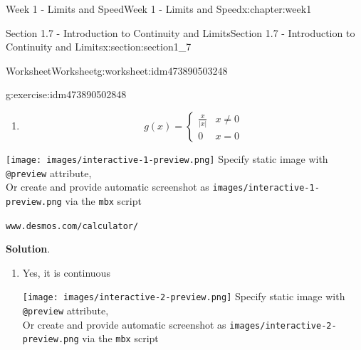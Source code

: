\documentclass[oneside,10pt,]{book}
\newcommand{\blocktitlefont}{\relax}
\newcommand{\mono}[1]{\texttt{#1}}
\numberwithin{equation}{section}
\newlength{\qrsize}
\newlength{\previewwidth}
\begin{document}
\begin{chapterptx}{Week 1 - Limits and Speed}{}{Week 1 - Limits and Speed}{}{}{x:chapter:week1}
\begin{sectionptx}{Section 1.7 - Introduction to Continuity and Limits}{}{Section 1.7 - Introduction to Continuity and Limits}{}{}{x:section:section1_7}
\begin{worksheet-subsection}{Worksheet}{}{Worksheet}{}{}{g:worksheet:idm473890503248}
\begin{divisionexercise}{1}{}{}{g:exercise:idm473890502848}
\begin{enumerate}[label=(\alph*)]
\begin{equation*}
\end{equation*}
%
\item{}%
\begin{equation*}
g(x) = \left\{ \begin{matrix} \frac x{\left\vert x \right\vert} & x \neq 0 \\ 0 & x = 0 \end{matrix} \right. 
\end{equation*}
%
\end{enumerate}
\setlength{\qrsize}{9em}
\setlength{\previewwidth}{\linewidth}
\addtolength{\previewwidth}{-\qrsize}
\begin{tcbraster}[raster columns=2, raster column skip=1pt, raster halign=center, raster force size=false, raster left skip=0pt, raster right skip=0pt]%
\begin{tcolorbox}[previewstyle, width=\previewwidth]%
%
{\texttt{[image: images/interactive-1-preview.png]}}%
{\small{}Specify static image with \mono{@preview} attribute,\\Or create and provide automatic screenshot as \mono{images/interactive-1-preview.png} via the \mono{mbx} script}%
\end{tcolorbox}%
\begin{tcolorbox}[qrstyle]%
{\hypersetup{urlcolor=black}}%
\end{tcolorbox}%
\begin{tcolorbox}[captionstyle]%
\small \mono{www.desmos.com/calculator/}\end{tcolorbox}%
\end{tcbraster}%
%
\textbf{\blocktitlefont Solution}.\hypertarget{g:solution:idm473890494624}{}\quad{}%
\begin{enumerate}[label=(\alph*)]
\item{}Yes, it is continuous%
\par
\setlength{\qrsize}{9em}
\setlength{\previewwidth}{\linewidth}
\addtolength{\previewwidth}{-\qrsize}
\begin{tcbraster}[raster columns=2, raster column skip=1pt, raster halign=center, raster force size=false, raster left skip=0pt, raster right skip=0pt]%
\begin{tcolorbox}[previewstyle, width=\previewwidth]%
%
{\texttt{[image: images/interactive-2-preview.png]}}%
{\small{}Specify static image with \mono{@preview} attribute,\\Or create and provide automatic screenshot as \mono{images/interactive-2-preview.png} via the \mono{mbx} script}%

\end{tcolorbox}
\end{tcbraster}
\end{enumerate}
\end{divisionexercise}
\end{worksheet-subsection}
\end{sectionptx}
\end{chapterptx}
\end{document}
